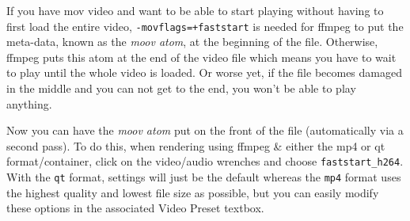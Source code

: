 If you have mov video and want to be able to start playing without having to first load the entire video, \texttt{-movflags=+faststart} is needed for ffmpeg to put the meta-data, known as the \textit{moov atom}, at the beginning of the file.  Otherwise, ffmpeg puts this atom at the end of the video file which means you have to wait to play until the whole video is loaded.  Or worse yet, if the file becomes damaged in the middle and you can not get to the end, you won’t be able to play anything.

Now you can have the \textit{moov atom} put on the front of the file (automatically via a second pass).  To do this, when rendering using ffmpeg \& either the mp4 or qt format/container, click on the video/audio wrenches and choose \texttt{faststart\_h264}.   With the \texttt{qt} format, settings will just be the default whereas the \texttt{mp4} format uses the highest quality and lowest file size as possible, but you can easily modify these options in the associated Video Preset textbox.

